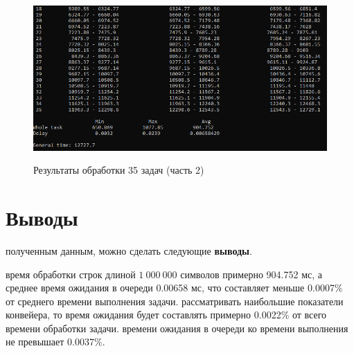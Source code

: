 \begin{figure}[h]
	\begin{center}
		{\includegraphics[scale = 0.85]{results/result_1_part_2}}
		\caption{Результаты обработки 35 задач (часть 2)}
		\label{fig9:image}
	\end{center}
\end{figure}

\section*{Выводы}
 полученным данным, можно сделать следующие \textbf{выводы}.
\begin{itemize}
	 время обработки строк длиной  $1\:000\:000$ символов примерно 904.752 мс, а среднее время ожидания в очереди 0.00658 мс, что составляет меньше 0.0007\% от среднего времени выполнения задачи.
	 рассматривать наибольшие показатели конвейера, то время ожидания будет составлять примерно 0.0022\% от всего времени обработки задачи.
	 времени ожидания в очереди ко времени выполнения не превышает 0.0037\%.
\end{itemize}
